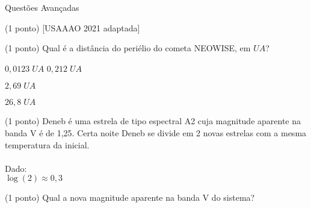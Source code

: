 \documentclass{../lista}
\begin{document}
\begin{secao}{Questões Avançadas}
\begin{questao}{(1 ponto) [USAAAO 2021 adaptada]}
			\begin{pergunta}{(1 ponto)}
				Qual é a distância do periélio do cometa NEOWISE, em $UA$?


				\begin{alternativas}
					\item $0,0123 \; UA$
					\alternativaMarcada $0,212 \; UA$
					\item $2,69 \; UA$
					\item $26,8 \; UA$
				\end{alternativas}
			\end{pergunta}
		\end{questao}

		\begin{questao}{(1 ponto)}
			Deneb é uma estrela de tipo espectral A2 cuja magnitude aparente na banda V é de 1,25. Certa noite Deneb se divide em 2 novas estrelas com a mesma temperatura da inicial. \\ \\
			Dado: \\
			$\log(2) \approx 0,3$

			\begin{pergunta}{(1 ponto)}
				Qual a nova magnitude aparente na banda V do sistema?


\end{pergunta}
\end{questao}
\end{secao}
\end{document}
